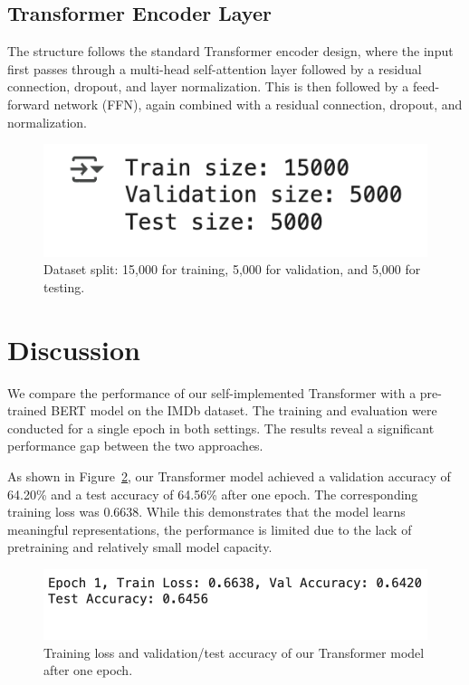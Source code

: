 \subsection{Transformer Encoder Layer}

The structure follows the standard Transformer encoder design, where the input first passes through a multi-head self-attention layer followed by a residual connection, dropout, and layer normalization. This is then followed by a feed-forward network (FFN), again combined with a residual connection, dropout, and normalization.

\begin{figure}[t]
\centering
\includegraphics[width=0.7\linewidth]{size.png}
\caption{Dataset split: 15,000 for training, 5,000 for validation, and 5,000 for testing.}
\label{fig:split}
\end{figure}

\section{Discussion}
\label{sec:discussion}

We compare the performance of our self-implemented Transformer with a pre-trained BERT model on the IMDb dataset. The training and evaluation were conducted for a single epoch in both settings. The results reveal a significant performance gap between the two approaches.

As shown in Figure~\ref{fig:transformer_result}, our Transformer model achieved a validation accuracy of 64.20\% and a test accuracy of 64.56\% after one epoch. The corresponding training loss was 0.6638. While this demonstrates that the model learns meaningful representations, the performance is limited due to the lack of pretraining and relatively small model capacity.

\begin{figure}[t]
\centering
\includegraphics[width=0.85\linewidth]{accuracy.png}
\caption{Training loss and validation/test accuracy of our Transformer model after one epoch.}
\label{fig:transformer_result}
\end{figure}

